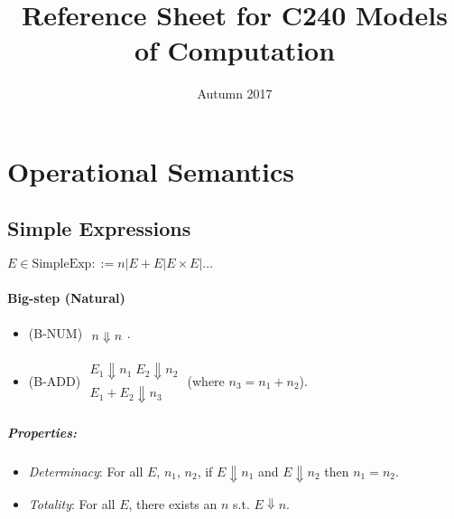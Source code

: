 \documentclass[twocolumn,english]{article}
\begin{document}
\title{Reference Sheet for C240 Models of Computation}

\date{Autumn 2017}
\maketitle

\section{Operational Semantics}

\subsection{Simple Expressions}

$E\in\text{SimpleExp}::=n\lvert E+E\lvert E\times E\lvert\dots$

\paragraph{Big-step (Natural)}
\begin{itemize}
\item {\scriptsize{}(B-NUM)} $\begin{array}{c}
\\
\hline n\Downarrow n
\end{array}$.
\item {\scriptsize{}(B-ADD)} $\begin{array}{c}
E_{1}\Downarrow n_{1}\;E_{2}\Downarrow n_{2}\\
\hline E_{1}+E_{2}\Downarrow n_{3}
\end{array}$ (where $n_{3}=n_{1}+n_{2}$).
\end{itemize}

\subparagraph{Properties:}
\begin{itemize}
\item \emph{Determinacy}: For all $E$, $n_{1}$, $n_{2}$, if $E\Downarrow n_{1}$
and $E\Downarrow n_{2}$ then $n_{1}=n_{2}$.
\item \emph{Totality}: For all $E$, there exists an $n$ s.t. $E\Downarrow n$.
\end{itemize}
\end{document}

